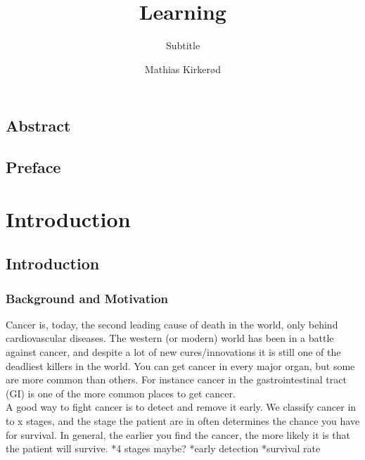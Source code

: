 \documentclass[a4paper,english]{ifimaster}
\title{Learning}
\subtitle{Subtitle}
\author{Mathias Kirkerød}
\begin{document}
\duoforside[dept={Department of Informatics},
program={Informatics: Language and Communication},
long]

\frontmatter{}
\chapter*{Abstract}

\tableofcontents{}
\listoffigures{}
\listoftables{}

\chapter*{Preface}

\mainmatter{}






















\part{Introduction}
\chapter{Introduction}
	\section{Background and Motivation}
	Cancer is, today, the second leading cause of death in the world, only behind 
	cardiovascular diseases. %
	The western (or modern) world has been in a battle against cancer, and despite a 
	lot of new cures/innovations it is still one of the deadliest killers in the world. 
	You can get cancer in every major organ, but some are more common than others.
	For instance cancer in the gastrointestinal tract (GI) is one of the more common places 
	to get cancer. %
	\\
	
	
	A good way to fight cancer is to detect and remove it early. We classify cancer in to x stages, and the 
	stage the patient are in often determines the chance you have for survival. In general, the earlier you 
	find the cancer, the more likely it is that the patient will survive. 
	*4 stages maybe?
	*early detection
	*survival rate
	
\end{document}
